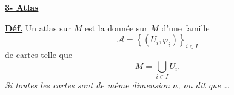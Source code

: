 \documentclass[11pt,a4paper]{article}
\begin{document}
%			
%			
%			
%			
%			
%			
%			
%			
%			
%			
%			
%		
	
	\underline{\textbf{3- Atlas}}
	
	\medskip
	
	\underline{\textbf{Déf.}} Un atlas sur $M$ est la donnée sur $M$ d'une famille
	\[
	\mathcal{A} = \left\{ (U_i, \varphi_i) \right\}_{i \in I}
	\]
	de cartes telle que
	\[
	M = \bigcup_{i \in I} U_i.
	\]
	\textit{Si toutes les cartes sont de même dimension $n$, on dit que \ldots}
	
\end{document}
